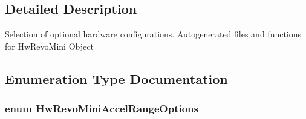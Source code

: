 \subsection{\-Detailed \-Description}
\-Selection of optional hardware configurations. \-Autogenerated files and functions for \-Hw\-Revo\-Mini \-Object 

\subsection{\-Enumeration \-Type \-Documentation}
\hypertarget{group___hw_revo_mini_gac7148c52e243f0fc1e4d6ecc5f549a14}{
\subsubsection[{\-Hw\-Revo\-Mini\-Accel\-Range\-Options}]{\setlength{\rightskip}{0pt plus 5cm}enum {\bf \-Hw\-Revo\-Mini\-Accel\-Range\-Options}}}\label{group___hw_revo_mini_gac7148c52e243f0fc1e4d6ecc5f549a14}

